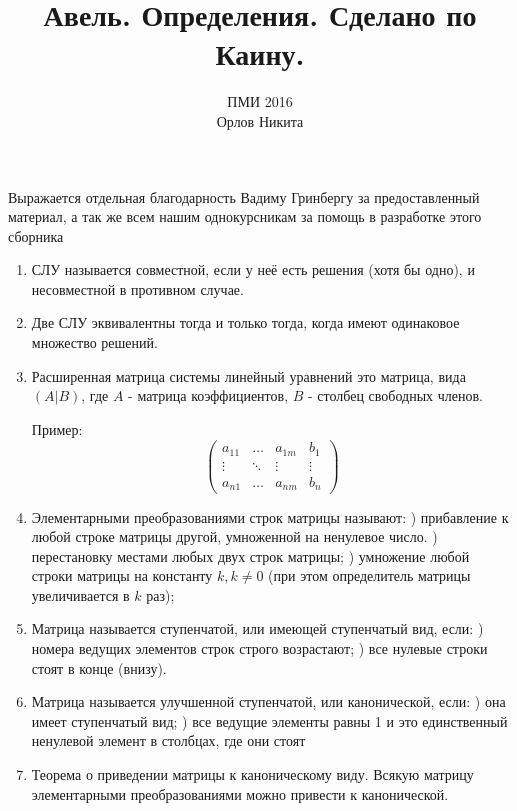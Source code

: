 \documentclass[a4paper,12pt]{article}
\begin{document}
	\title{Авель. Определения. Сделано по Каину.}
	\author{ПМИ 2016 \\ Орлов Никита}
	\maketitle
	 
	Выражается отдельная благодарность Вадиму Гринбергу за предоставленный материал, а так же всем нашим однокурсникам за помощь в разработке этого сборника
	
	\begin{enumerate}
		\item СЛУ называется совместной, если у неё есть решения (хотя бы одно), и несовместной в противном случае.
		\item Две СЛУ эквивалентны тогда и только тогда, когда имеют одинаковое множество решений.
		\item Расширенная матрица системы линейный уравнений это матрица, вида $(A|B)$, где $A$ - матрица коэффициентов, $B$ - столбец свободных членов.
		
		Пример:
		\[
		\left(
			\begin{array}{ccc|c}
			a_{11} & \ldots & a_{1m} & b_1 \\
			\vdots & \ddots & \vdots & \vdots \\
			a_{n1} & \ldots & a_{nm} & b_n
			\end{array}
		\right)
		\]
		
		\item Элементарными преобразованиями строк матрицы называют:
		) прибавление к любой строке матрицы другой, умноженной на ненулевое число.
		) перестановку местами любых двух строк матрицы;
		) умножение любой строки матрицы на константу $k, k \neq 0$ (при этом определитель
		матрицы увеличивается в $k$ раз);
		
		\item Матрица называется ступенчатой, или имеющей ступенчатый вид, если:
		) номера ведущих элементов строк строго возрастают;
		) все нулевые строки стоят в конце (внизу).
		
		\item Матрица называется улучшенной ступенчатой, или канонической, если:
		) она имеет ступенчатый вид;
		) все ведущие элементы равны 1 и это единственный ненулевой элемент в столбцах, где они стоят
		
		\item Теорема о приведении матрицы к каноническому виду. Всякую матрицу элементарными преобразованиями можно привести к канонической.


\end{enumerate}
\end{document}
